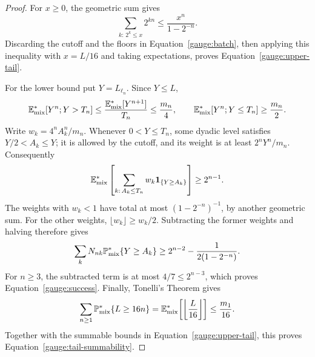 \begin{proof}
For \(x\ge0\), the geometric sum gives
\[
\sum_{k:\,2^k\le x}2^{kn}
\le\frac{x^n}{1-2^{-n}}.
\]
Discarding the cutoff and the floors in Equation~\eqref{gauge:batch},
then applying this inequality with \(x=L/16\) and taking
expectations, proves Equation~\eqref{gauge:upper-tail}.

For the lower bound put \(Y=L_{\ell_n}\). Since \(Y\le L\),
\[
\mathbb E^*_{\mathrm{mix}}[Y^n;Y>T_n]
\le\frac{\mathbb E^*_{\mathrm{mix}}[Y^{n+1}]}{T_n}
\le\frac{m_n}{4},
\qquad
\mathbb E^*_{\mathrm{mix}}[Y^n;Y\le T_n]\ge\frac{m_n}{2}.
\]
Write \(w_k=4^nA_k^n/m_n\). Whenever \(0<Y\le T_n\),
some dyadic level satisfies \(Y/2<A_k\le Y\); it is allowed
by the cutoff, and its weight is at least \(2^nY^n/m_n\).
Consequently
\[
\mathbb E^*_{\mathrm{mix}}\left[
\sum_{k:\,A_k\le T_n}w_k\mathbf 1_{\{Y\ge A_k\}}\right]
\ge2^{n-1}.
\]
The weights with \(w_k<1\) have total at most
\((1-2^{-n})^{-1}\), by another geometric sum. For the other
weights, \(\lfloor w_k\rfloor\ge w_k/2\). Subtracting the former
weights and halving therefore gives
\[
\sum_kN_{nk}\mathbb P^*_{\mathrm{mix}}\{Y\ge A_k\}
\ge2^{n-2}-\frac{1}{2(1-2^{-n})}.
\]
For \(n\ge3\), the subtracted term is at most \(4/7\le2^{n-3}\),
which proves Equation~\eqref{gauge:success}.
Finally, Tonelli's Theorem gives
\[
\sum_{n\ge1}\mathbb P^*_{\mathrm{mix}}\{L\ge16n\}
=\mathbb E^*_{\mathrm{mix}}\!\left[\left\lfloor\frac L{16}\right\rfloor\right]
\le\frac{m_1}{16}.
\]
Together with the summable bounds in Equation~\eqref{gauge:upper-tail},
this proves Equation~\eqref{gauge:tail-summability}.
\end{proof}
